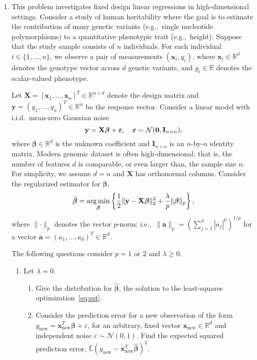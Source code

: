 \documentclass[12pt]{article}
\def\ma{\mathbf{a}}
\def\mx{\mathbf{x}}
\def\my{\mathbf{y}}
\def\mX{\mathbf{X}}
\def\mI{\mathbf{I}}
\def\bbeta{{\boldsymbol{\beta}}}
\def\bepsilon{\boldsymbol{\varepsilon}}
\def\tN{\mathcal{N}}
\DeclareMathOperator*{\argmin}{arg\,min}
\newcommand{\normSize}[2]{#1\lVert#2#1\rVert}
\begin{document}
\begin{enumerate}
\setcounter{enumi}{0}

\item This problem investigates fixed design linear regressions in high-dimensional settings.
Consider a study of human heritability where the goal is to estimate the contribution of many genetic variants (e.g.,\ single nucleotide polymorphisms) to a quantitative phenotypic trait (e.g.,\ height). Suppose that the study sample consists of $n$ individuals. For each individual $i\in\{1,\ldots,n\}$, we observe a pair of measurements $(\mx_i, y_i)$, where $\mx_i\in\mathbb{R}^{d}$ denotes the genotype vector across $d$ genetic variants, and $y_i\in\mathbb{R}$ denotes the scalar-valued phenotype. 

Let $\mX=[\mx_1,\ldots,\mx_n]^T\in\mathbb{R}^{n\times d}$ denote the design matrix and $\my=(y_1,\ldots,y_n)^T\in\mathbb{R}^n$ be the response vector. 
Consider a linear model with i.i.d.\ mean-zero Gaussian noise
\begin{equation}\label{eq:model}
\my=\mX\bbeta+\bepsilon, \quad \bepsilon\sim \mathcal{N}({\bf 0}, \mI_{n\times n}),
\end{equation}
where $\bbeta\in\mathbb{R}^d$ is the unknown coefficient and $\mI_{n\times n}$ is an $n$-by-$n$ identity matrix. Modern genomic dataset is often high-dimensional; that is, the number of features $d$ is comparable, or even larger than, the sample size $n$. For simplicity, we assume $d=n$ and $\mX$ has orthonormal columns. Consider the regularized estimator for $\bbeta$, 
\begin{equation}\label{eq:est}
\hat \bbeta =\argmin_{\bbeta}\left\{ {1\over 2}\normSize{}{\my-\mX\bbeta}_2^2+{\lambda \over p} \normSize{}{\bbeta}_p\right\},
\end{equation}
where $\normSize{}{\cdot}_p$ denotes the vector $p$-norm; i.e.,\ $\normSize{}{\ma}_p=\left(\sum_{j=1}^d {|a_j|^p}\right)^{1/p}$ for a vector $\ma=(a_1,\ldots,a_d)^T\in\mathbb{R}^d$. 

 The following questions consider $p=1$ or $2$ and $\lambda \geq 0$. 
\begin{enumerate}
\item Let $\lambda = 0$.
\begin{enumerate}
\item Give the distribution for $\hat \bbeta$, the solution to the least-squares optimization~\eqref{eq:est}.
\item Consider the prediction error for a new observation of the form $y_{\text{new}}=\mx_{\text{new}}^T\bbeta+\varepsilon$, for an arbitrary, fixed vector $\mx_{\text{new}}\in\mathbb{R}^d$ and independent noise $\varepsilon\sim \tN(0,1)$. Find the expected squared prediction error, $\mathbb{E}(y_{\text{new}}-\mx_{\text{new}}^T\hat \bbeta)^2$.
\end{enumerate}


\end{enumerate}
\end{enumerate}
\end{document}
